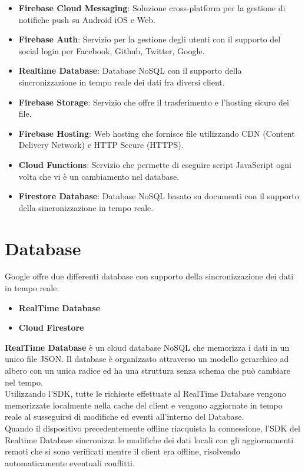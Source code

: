 \begin{itemize}                         %
\item \textbf{Firebase Cloud Messaging}: Soluzione cross-platform per la gestione di notifiche push su Android iOS e Web.

\item \textbf{Firebase Auth}: Servizio per la gestione degli utenti con il supporto del social login per Facebook, Github, Twitter, Google.

\item \textbf{Realtime Database}: Database NoSQL con il supporto della sincronizzazione in tempo reale dei dati fra diversi client.

\item \textbf{Firebase Storage}: Servizio che offre il trasferimento e l'hosting sicuro dei file.

\item \textbf{Firebase Hosting}: Web hosting che fornisce file utilizzando CDN (Content Delivery Network) e HTTP Secure (HTTPS).

\item \textbf{Cloud Functions}: Servizio che permette di eseguire script JavaScript ogni volta che vi è un cambiamento nel database.

\item \textbf{Firestore Database}: Database NoSQL basato su documenti con il supporto della sincronizzazione in tempo reale.
\end{itemize}




\section{Database}                 %
Google offre due differenti database con supporto della sincronizzazione dei dati in tempo reale:

\begin{itemize}
  \item \textbf{RealTime Database}
  \item \textbf{Cloud Firestore}
\end{itemize}


\textbf{RealTime Database} è un cloud database NoSQL che memorizza i dati in un unico file JSON. Il database è organizzato attraverso un modello gerarchico ad albero con un unica radice ed ha una struttura senza schema che può cambiare nel tempo.\\
Utilizzando l'SDK, tutte le richieste effettuate al RealTime Database vengono memorizzate localmente nella cache del client e vengono aggiornate in tempo reale al susseguirsi di modifiche ed eventi all'interno del Database.\\
Quando il dispositivo precedentemente offline riacquista la connessione, l'SDK del Realtime Database sincronizza le modifiche dei dati locali con gli aggiornamenti remoti che si sono verificati mentre il client era offline, risolvendo automaticamente eventuali conflitti.\\


